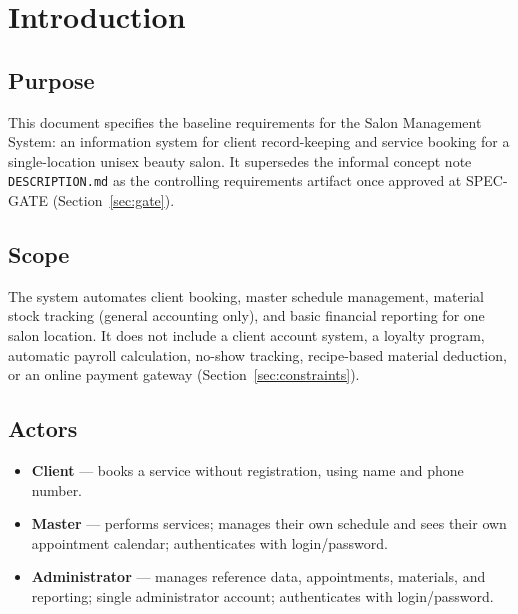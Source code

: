 \documentclass[11pt,a4paper]{article}
\begin{document}
\newpage

\section{Introduction}

\subsection{Purpose}

This document specifies the baseline requirements for the Salon Management
System: an information system for client record-keeping and service booking
for a single-location unisex beauty salon. It supersedes the informal
concept note \texttt{DESCRIPTION.md} as the controlling requirements
artifact once approved at SPEC-GATE (Section~\ref{sec:gate}).

\subsection{Scope}

The system automates client booking, master schedule management, material
stock tracking (general accounting only), and basic financial reporting for
one salon location. It does not include a client account system, a loyalty
program, automatic payroll calculation, no-show tracking, recipe-based
material deduction, or an online payment gateway
(Section~\ref{sec:constraints}).

\subsection{Actors}

\begin{itemize}[leftmargin=1.2cm]

\item
\textbf{Client} --- books a service without registration, using name and
phone number.

\item
\textbf{Master} --- performs services; manages their own schedule and sees
their own appointment calendar; authenticates with login/password.

\item
\textbf{Administrator} --- manages reference data, appointments,
materials, and reporting; single administrator account; authenticates
with login/password.

\end{itemize}
\end{document}
